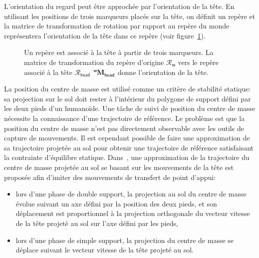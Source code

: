 L'orientation du regard peut être approchée par l'orientation de la tête.
En utilisant les positions de trois marqueurs placés sur la tête, on définit un repère et la matrice
de transformation de rotation par rapport au repère du monde représentera l'orientation 
de la tête dans ce repère (voir figure~\ref{fig:gazeDemo}). 
\begin{figure}[t]
  \begin{center}
    \resizebox{0.7\textwidth}{!}{
    
    }
  \end{center}
  \caption[Mesure de l'orientation de la t\^ete.]{Un repère est associé à la tête à partir de trois marqueurs. La matrice de transformation du repère
  d'origine $\mathcal{R}_{\textsf{w}}$ vers le repère associé à la tête $\mathcal{R}_{\textsf{head}}$ 
  $\tensor[^{\textsf{w}}]{\mathbf{M}}{_{\textsf{head}}}$ donne l'orientation de la tête.}
  \label{fig:gazeDemo}
\end{figure}
La position du centre de masse est utilisé comme un critère de stabilité statique:
sa projection sur le sol doit rester à l'intérieur du polygone de support défini par
les deux pieds d'un humanoïde. Une t\^ache de suivi de position du centre
de masse nécessite la connaissance d'une trajectoire de référence.
Le problème est que la position du centre de masse n'est pas directement observable
avec les outils de capture de mouvements. Il est cependant possible de
faire une approximation de sa trajectoire projetée au sol pour obtenir
une trajectoire de référence satisfaisant la contrainte d'équilibre statique. Dans~\cite{montecillo10},
une approximation de la trajectoire du centre de masse projetée au sol se basant 
sur les mouvements de la tête est proposée afin d'imiter des mouvements de transfert de point
d'appui:
\begin{itemize}
  \item lors d'une phase de double support, la projection au sol du centre de masse évolue suivant 
    un axe défini par la position des deux pieds, et son déplacement est proportionnel 
    à la projection orthogonale du vecteur vitesse de la tête projeté au sol sur l'axe défini par les pieds,
  \item lors d'une phase de simple support, la projection du centre de masse se déplace
    suivant le vecteur vitesse de la tête projeté au sol.
\end{itemize}
